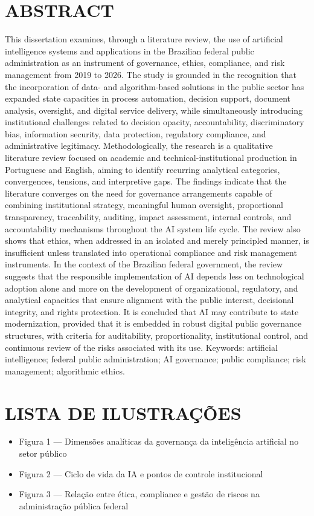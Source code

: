 \documentclass[12pt,a4paper]{article}
\begin{document}
\section*{ABSTRACT}
\label{sec:org38d5d36}
This dissertation examines, through a literature review, the use of artificial intelligence systems and applications in the Brazilian federal public administration as an instrument of governance, ethics, compliance, and risk management from 2019 to 2026. The study is grounded in the recognition that the incorporation of data- and algorithm-based solutions in the public sector has expanded state capacities in process automation, decision support, document analysis, oversight, and digital service delivery, while simultaneously introducing institutional challenges related to decision opacity, accountability, discriminatory bias, information security, data protection, regulatory compliance, and administrative legitimacy. Methodologically, the research is a qualitative literature review focused on academic and technical-institutional production in Portuguese and English, aiming to identify recurring analytical categories, convergences, tensions, and interpretive gaps. The findings indicate that the literature converges on the need for governance arrangements capable of combining institutional strategy, meaningful human oversight, proportional transparency, traceability, auditing, impact assessment, internal controls, and accountability mechanisms throughout the AI system life cycle. The review also shows that ethics, when addressed in an isolated and merely principled manner, is insufficient unless translated into operational compliance and risk management instruments. In the context of the Brazilian federal government, the review suggests that the responsible implementation of AI depends less on technological adoption alone and more on the development of organizational, regulatory, and analytical capacities that ensure alignment with the public interest, decisional integrity, and rights protection. It is concluded that AI may contribute to state modernization, provided that it is embedded in robust digital public governance structures, with criteria for auditability, proportionality, institutional control, and continuous review of the risks associated with its use.
Keywords: artificial intelligence; federal public administration; AI governance; public compliance; risk management; algorithmic ethics.
\section*{LISTA DE ILUSTRAÇÕES}
\label{sec:org10eb41a}
\begin{itemize}
\item Figura 1 — Dimensões analíticas da governança da inteligência artificial no setor público
\item Figura 2 — Ciclo de vida da IA e pontos de controle institucional
\item Figura 3 — Relação entre ética, compliance e gestão de riscos na administração pública federal
\end{itemize}
\end{document}
